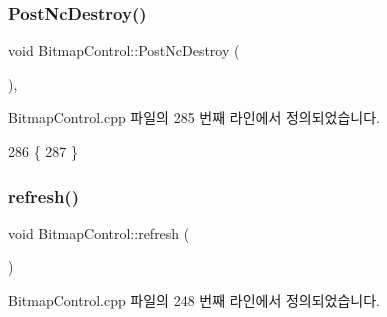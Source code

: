 \subsubsection{\texorpdfstring{Post\+Nc\+Destroy()}{PostNcDestroy()}}
{\footnotesize\ttfamily void Bitmap\+Control\+::\+Post\+Nc\+Destroy (\begin{DoxyParamCaption}{ }\end{DoxyParamCaption})\hspace{0.3cm}{\ttfamily [protected]}, {\ttfamily [virtual]}}



Bitmap\+Control.\+cpp 파일의 285 번째 라인에서 정의되었습니다.


\begin{DoxyCode}
286 \{
287 \}
\end{DoxyCode}
\mbox{\label{class_bitmap_control_acf061a1e9a4cad90ad2827c14f79caa2}} 
\subsubsection{\texorpdfstring{refresh()}{refresh()}}
{\footnotesize\ttfamily void Bitmap\+Control\+::refresh (\begin{DoxyParamCaption}{ }\end{DoxyParamCaption})}



Bitmap\+Control.\+cpp 파일의 248 번째 라인에서 정의되었습니다.


